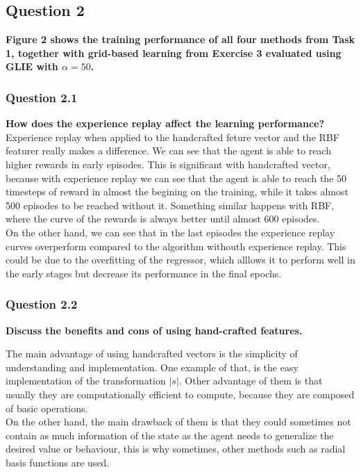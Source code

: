 \documentclass[12pt]{article}
\begin{document}
\subsection{Question 2}
\textbf{
Figure 2 shows the training performance of all four methods from Task 1, together with grid-based learning from Exercise 3 evaluated using GLIE with $\alpha = 50$.
}

\subsubsection{Question 2.1}
\textbf{How does the experience replay affect the learning performance?}\\

Experience replay when applied to the handcrafted feture vector and the RBF featurer really makes a difference. We can see that the agent is able to reach higher rewards in early episodes. This is significant with handcrafted vector, because with experience replay we can see that the agent is able to reach the 50 timesteps of reward in almost the begining on the training, while it takes almost 500 episodes to be reached without it. Something similar happens with RBF, where the curve of the rewards is always better until almost 600 episodes. \\

On the other hand, we can see that in the last episodes the experience replay curves overperform compared to the algorithm withouth experience replay. This could be due to the overfitting of the regressor, which alllows it to perform well in the early stages but decrease its performance in the final epochs.

\subsubsection{Question 2.2}
\textbf{Discuss the benefits and cons of using hand-crafted features.}

The main advantage of using handcrafted vectors is the simplicity of understanding and implementation. One example of that, is the easy implementation of the transformation $|s|$. Other advantage of them is that usually they are computationally efficient to compute, because they are composed of basic operations.\\

On the other hand, the main drawback of them is that they could sometimes not contain as much information of the state as the agent needs to generalize the desired value or behaviour, this is why sometimes, other methods such as radial basis functions are used.
\end{document}
